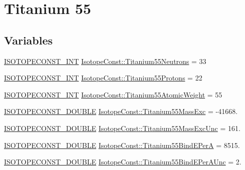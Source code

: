 \hypertarget{group___isotope_const-_titanium-_ti55}{}\section{Titanium 55}
\label{group___isotope_const-_titanium-_ti55}
\subsection*{Variables}
\begin{DoxyCompactItemize}
\item 
\mbox{\hyperlink{group___isotope_const-_macros_ga5f18360b3e99483a35c32d789e62621c}{I\+S\+O\+T\+O\+P\+E\+C\+O\+N\+S\+T\+\_\+\+I\+NT}} \mbox{\hyperlink{group___isotope_const-_titanium-_ti55_gaf07c369633d3ae562eddf21e7b6f1bd7}{Isotope\+Const\+::\+Titanium55\+Neutrons}} = 33
\item 
\mbox{\hyperlink{group___isotope_const-_macros_ga5f18360b3e99483a35c32d789e62621c}{I\+S\+O\+T\+O\+P\+E\+C\+O\+N\+S\+T\+\_\+\+I\+NT}} \mbox{\hyperlink{group___isotope_const-_titanium-_ti55_ga27735e193f15afc45c3b900815fc23e8}{Isotope\+Const\+::\+Titanium55\+Protons}} = 22
\item 
\mbox{\hyperlink{group___isotope_const-_macros_ga5f18360b3e99483a35c32d789e62621c}{I\+S\+O\+T\+O\+P\+E\+C\+O\+N\+S\+T\+\_\+\+I\+NT}} \mbox{\hyperlink{group___isotope_const-_titanium-_ti55_ga3b36ffef9f9934c81d95c4ff43534024}{Isotope\+Const\+::\+Titanium55\+Atomic\+Weight}} = 55
\item 
\mbox{\hyperlink{group___isotope_const-_macros_ga8f45a7272ce02c0b4c65c44636ed719a}{I\+S\+O\+T\+O\+P\+E\+C\+O\+N\+S\+T\+\_\+\+D\+O\+U\+B\+LE}} \mbox{\hyperlink{group___isotope_const-_titanium-_ti55_ga7be52518eda6329a20655f492c96638a}{Isotope\+Const\+::\+Titanium55\+Mass\+Exc}} = -\/41668.
\item 
\mbox{\hyperlink{group___isotope_const-_macros_ga8f45a7272ce02c0b4c65c44636ed719a}{I\+S\+O\+T\+O\+P\+E\+C\+O\+N\+S\+T\+\_\+\+D\+O\+U\+B\+LE}} \mbox{\hyperlink{group___isotope_const-_titanium-_ti55_ga9aa55fcdfc60de2b00d4d95f6f576c98}{Isotope\+Const\+::\+Titanium55\+Mass\+Exc\+Unc}} = 161.
\item 
\mbox{\hyperlink{group___isotope_const-_macros_ga8f45a7272ce02c0b4c65c44636ed719a}{I\+S\+O\+T\+O\+P\+E\+C\+O\+N\+S\+T\+\_\+\+D\+O\+U\+B\+LE}} \mbox{\hyperlink{group___isotope_const-_titanium-_ti55_ga0695d96ac962072b905520d3fe8025aa}{Isotope\+Const\+::\+Titanium55\+Bind\+E\+PerA}} = 8515.
\item 
\mbox{\hyperlink{group___isotope_const-_macros_ga8f45a7272ce02c0b4c65c44636ed719a}{I\+S\+O\+T\+O\+P\+E\+C\+O\+N\+S\+T\+\_\+\+D\+O\+U\+B\+LE}} \mbox{\hyperlink{group___isotope_const-_titanium-_ti55_ga8516bdd74effaf775edec43e1b82fd93}{Isotope\+Const\+::\+Titanium55\+Bind\+E\+Per\+A\+Unc}} = 2.

\end{DoxyCompactItemize}
